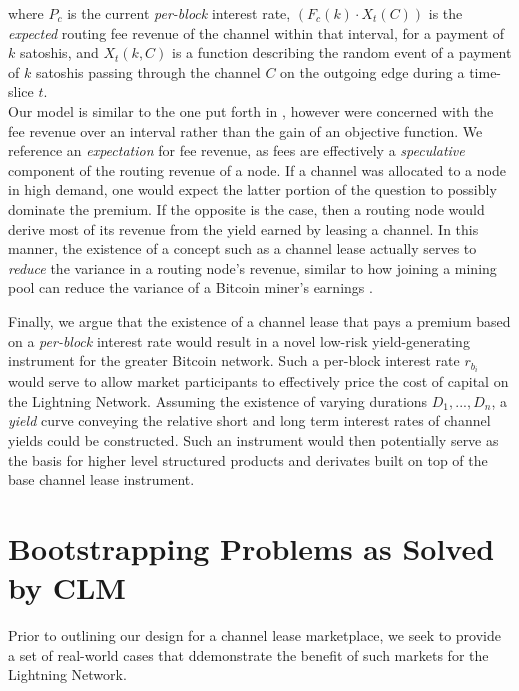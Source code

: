\documentclass[10pt,a4paper]{article}
\theoremstyle{definition}
\begin{document}
where $P_c$ is the current \emph{per-block} interest rate, $(F_c(k)\cdot
X_{t}(C))$ is the \emph{expected} routing fee revenue of the channel within
that interval, for a payment of $k$ satoshis, and $X_{t}(k, C)$ is a function
describing the random event of a payment of $k$ satoshis passing through the
channel $C$ on the outgoing edge during a time-slice $t$. \\

Our model is similar to the one put forth in \cite{payChanProfit}, however were
concerned with the fee revenue over an interval rather than the gain of an
objective function. We reference an \emph{expectation} for fee revenue, as fees
are effectively a \emph{speculative} component of the routing revenue of a
node. If a channel was allocated to a node in high demand, one would expect the
latter portion of the question to possibly dominate the premium. If the
opposite is the case, then a routing node would derive most of its revenue from
the yield earned by leasing a channel. In this manner, the existence of a
concept such as a channel lease actually serves to \emph{reduce} the variance
in a routing node's revenue, similar to how joining a mining pool can reduce
the variance of a Bitcoin miner's earnings \cite{meniVariance}.

Finally, we argue that the existence of a channel lease that pays a premium
based on a \emph{per-block} interest rate would result in a novel low-risk
yield-generating instrument for the greater Bitcoin network. Such a per-block
interest rate $r_{b_i}$ would serve to allow market participants to effectively
price the cost of capital on the Lightning Network. Assuming the existence of
varying durations ${D_1, ..., D_n}$, a \emph{yield} curve conveying the relative
short and long term interest rates of channel yields could be constructed. Such
an instrument would then potentially serve as the basis for higher level
structured products and derivates built on top of the base channel lease
instrument.


\section{Bootstrapping Problems as Solved by CLM}

Prior to outlining our design for a channel lease marketplace, we seek to
provide a set of real-world cases that ddemonstrate the benefit of such markets
for the Lightning Network. 
\end{document}
